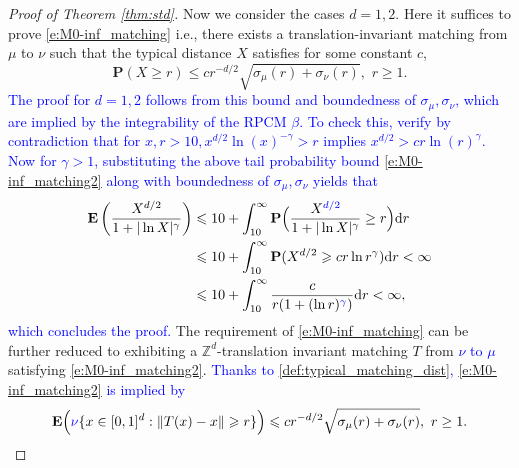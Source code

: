 \documentclass[12pt]{article}
\newcommand{\Z}{\mathbb{Z}}
\newcommand{\1}{\mathbf{1}}
\newcommand{\md}{\mathrm{d}}
\newcommand{\pr}{\mathbf  P}
\newcommand{\RL}[1]{\textcolor{blue}{#1}}
\newcommand{\dy}[1]{\textcolor{blue}{#1}}
\newcommand{\RL}[1]{#1}%
\newcommand{\dy}[1]{#1}%
\begin{document}
{{{{{\begin{proof}[Proof of Theorem \ref{thm:std}]
 

{Now we consider the cases $d = 1,2$. Here it suffices to prove \eqref{e:M0-inf_matching} i.e., there exists a translation-invariant matching from $\mu$ to $\nu$ such that the typical distance $X$ satisfies for some constant $c$,
%
\begin{equation}
\label{e:M0-inf_matching2}
\pr(X \geqslant  r) \leqslant c r^{-d/2} \sqrt{\sigma_{\mu}(r) + \sigma_{\nu}(r)}, \, \, r \geq 1.
\end{equation}
%
\dy{ The proof for $d =1,2$ follows from this bound and boundedness of $\sigma_\mu,\sigma_\nu$, which are implied by the integrability of the RPCM $\beta$.  To check this, verify by contradiction that for $ x,r>10, x^{d/2}\ln(x)^{-\gamma }>r$ implies $ x^{d/2}>cr\ln(r)^{\gamma }$. Now for $\gamma > 1$, substituting the above tail probability bound \eqref{e:M0-inf_matching2} along with boundedness of $\sigma_\mu,\sigma_\nu$ yields that
%
\begin{align*}
\mathbf E \left(
\frac{ X^{d/2}}{1 +  | \ln X | ^{ \gamma }}
\right) & \leqslant 10 + \int_{10}^{\infty} \mathbf{P}\Big( \frac{ X^{ \RL{d/2}}}{1 +  | \ln X | ^{ \gamma }} \geq r \Big) \md r \\
& \leqslant 10 + \int_{10}^{\infty} \mathbf P (X^{d/2} \geqslant cr\ln r^{ \gamma }) \md r <\infty \\
& \leqslant 10 + \int_{10}^{\infty} \frac{c}{r(1 + (\ln r)^{ \RL{\gamma }})} \md r < \infty,
\end{align*}
%
which concludes the proof.} 
The requirement of \eqref{e:M0-inf_matching} can be further reduced to exhibiting a $\Z^d$-translation invariant matching $T$ from \dy{$\nu$ to $\mu$} satisfying \eqref{e:M0-inf_matching2}.} \dy{Thanks to \eqref{def:typical_matching_dist}, \eqref{e:M0-inf_matching2} is implied by
%
\begin{equation}
\label{e:Exp_T_match}\mathbf{E}\Big( \dy{\nu} \{x \in [0,1]^d : \|T(x) - x\| \geqslant  r\} \Big) \leqslant  c r^{-d/2} \sqrt{\sigma_{\mu}(r) + \sigma_{\nu}(r)}, \, \, r \geq 1.
\end{equation}
%
}


\end{proof}}}}}}
\end{document}
